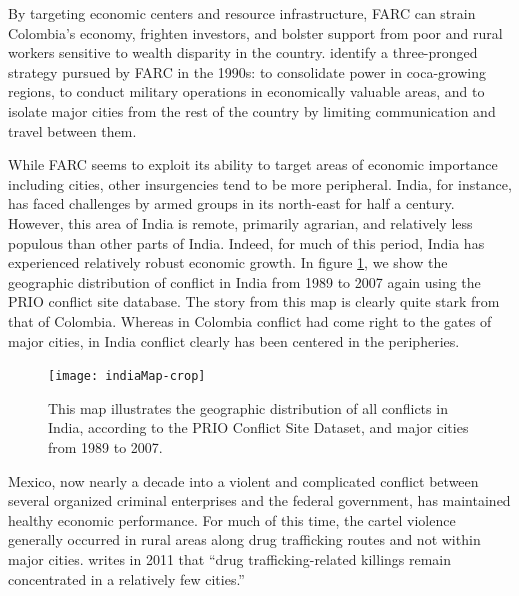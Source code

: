 By targeting economic centers and resource infrastructure, FARC can strain Colombia's economy, frighten investors, and bolster support from poor and rural workers sensitive to wealth disparity in the country. \citet{rabasa:chalk:2001} identify a three-pronged strategy pursued by FARC in the 1990s: to consolidate power in coca-growing regions, to conduct military operations in economically valuable areas, and to isolate major cities from the rest of the country by limiting communication and travel between them.  

While FARC seems to exploit its ability to target areas of economic importance including cities, other insurgencies tend to be more peripheral. India, for instance, has faced challenges by armed groups in its north-east for half a century. However, this area of India is remote, primarily agrarian, and relatively less populous than other parts of India. Indeed, for much of this period, India has experienced relatively robust economic growth. In figure \ref{fig:indiaMap}, we show the geographic distribution of conflict in India from 1989 to 2007 again using the PRIO conflict site database. The story from this map is clearly quite stark from that of Colombia. Whereas in Colombia conflict had come right to the gates of major cities, in India conflict clearly has been centered in the peripheries.

\begin{figure}[ht]
	\centering
	\texttt{[image: indiaMap-crop]}
	\caption{This map illustrates the geographic distribution of all conflicts in India, according to the PRIO Conflict Site Dataset, and major cities from 1989 to 2007. }
	\label{fig:indiaMap}
\end{figure}

Mexico, now nearly a decade into a violent and complicated conflict between several organized criminal enterprises and the federal government, has maintained healthy economic performance. For much of this time, the cartel violence generally occurred in rural areas along drug trafficking routes and not within major cities. \citet{beittel:2011} writes in 2011 that ``drug trafficking-related killings remain concentrated in a relatively few cities.''

